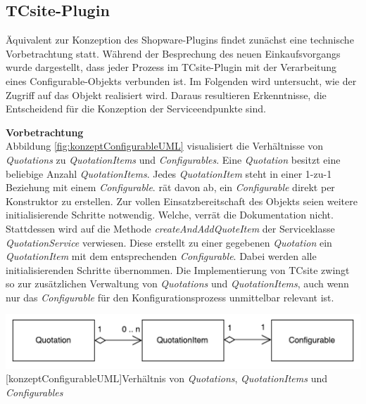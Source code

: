 \documentclass[11pt, a4paper, titlepage, listof=totoc, bibliography=totoc, index=totoc, twoside, openright, headings=normal]{scrreprt}
\begin{document}
\subsection{TCsite-Plugin}
\label{subsection:TCsite-Plugin}
Äquivalent zur Konzeption des Shopware-Plugins findet zunächst eine technische Vorbetrachtung statt. Während der Besprechung des neuen Einkaufsvorgangs wurde dargestellt, dass jeder Prozess im TCsite-Plugin mit der Verarbeitung eines {Configurable}-Objekts verbunden ist. Im Folgenden wird untersucht, wie der Zugriff auf das Objekt realisiert wird. Daraus resultieren Erkenntnisse, die Entscheidend für die Konzeption der Serviceendpunkte sind.

\textbf{Vorbetrachtung}\\
Abbildung \ref{fig:konzeptConfigurableUML} visualisiert die Verhältnisse von \emph{Quotations} zu \emph{QuotationItems} und \emph{Configurables}. Eine \emph{Quotation} besitzt eine beliebige Anzahl \emph{QuotationItems}. Jedes \emph{QuotationItem} steht in einer 1-zu-1 Beziehung mit einem \emph{Configurable}. \citet{tactonTCsiteDevelopmentManual} rät davon ab, ein \emph{Configurable} direkt per Konstruktor zu erstellen. Zur vollen Einsatzbereitschaft des Objekts seien weitere initialisierende Schritte notwendig. Welche, verrät die Dokumentation nicht. Stattdessen wird auf die Methode \emph{createAndAddQuoteItem} der Serviceklasse \emph{QuotationService} verwiesen.  Diese erstellt zu einer gegebenen \emph{Quotation} ein \emph{QuotationItem} mit dem entsprechenden \emph{Configurable}. Dabei werden alle initialisierenden Schritte übernommen. Die Implementierung von TCsite zwingt so zur zusätzlichen Verwaltung von \emph{Quotations} und \emph{QuotationItems}, auch wenn nur das \emph{Configurable} für den Konfigurationsprozess unmittelbar relevant ist.

\vspace{1em}
\begin{minipage}{\linewidth}
	\centering
	\includegraphics[width=1\linewidth]{Abbildungen/konzeptConfigurableUML.pdf}
	[konzeptConfigurableUML]{Verhältnis von \emph{Quotations}, \emph{QuotationItems} und \emph{Configurables}}
	\label{fig:konzeptConfigurableUML}
\end{minipage}
\vspace{1em}
\end{document}
